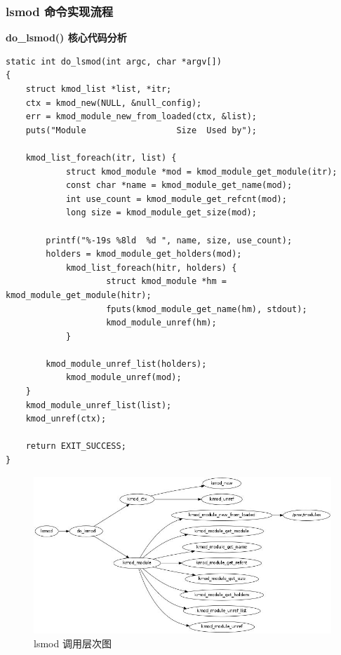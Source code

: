 \documentclass[11pt,a4paper]{article}
\makeatletter
\def\maxwidth{\ifdim\Gin@nat@width>\linewidth\linewidth
\else\Gin@nat@width\fi}
\let\Oldincludegraphics\includegraphics
\renewcommand{\includegraphics}[1]{\Oldincludegraphics[width=\maxwidth]{#1}}
\makeatother
\begin{document}
\subsubsection{lsmod 命令实现流程}

\textbf{do\_lsmod() 核心代码分析}

{\begin{shaded}\begin{verbatim}
static int do_lsmod(int argc, char *argv[])
{
    struct kmod_list *list, *itr;
    ctx = kmod_new(NULL, &null_config); 
    err = kmod_module_new_from_loaded(ctx, &list);
    puts("Module                  Size  Used by");

    kmod_list_foreach(itr, list) {
            struct kmod_module *mod = kmod_module_get_module(itr);
            const char *name = kmod_module_get_name(mod);
            int use_count = kmod_module_get_refcnt(mod);
            long size = kmod_module_get_size(mod);

        printf("%-19s %8ld  %d ", name, size, use_count);
        holders = kmod_module_get_holders(mod);
            kmod_list_foreach(hitr, holders) {
                    struct kmod_module *hm = kmod_module_get_module(hitr);
                    fputs(kmod_module_get_name(hm), stdout);
                    kmod_module_unref(hm);
            }

        kmod_module_unref_list(holders);
            kmod_module_unref(mod);
    }
    kmod_module_unref_list(list);
    kmod_unref(ctx);

    return EXIT_SUCCESS;
}
\end{verbatim}\end{shaded}}
\begin{figure}[htbp]
\centering
\includegraphics{./figures/lsmod.jpg}
\caption{lsmod 调用层次图}
\end{figure}
\end{document}
